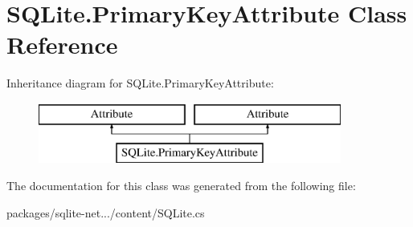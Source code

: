 \hypertarget{classSQLite_1_1PrimaryKeyAttribute}{\section{S\-Q\-Lite.\-Primary\-Key\-Attribute Class Reference}
\label{classSQLite_1_1PrimaryKeyAttribute}
}
Inheritance diagram for S\-Q\-Lite.\-Primary\-Key\-Attribute\-:\begin{figure}[H]
\begin{center}
\leavevmode
\includegraphics[height=2.000000cm]{classSQLite_1_1PrimaryKeyAttribute}
\end{center}
\end{figure}


The documentation for this class was generated from the following file\-:\begin{DoxyCompactItemize}
\item 
packages/sqlite-\/net.../content/S\-Q\-Lite.\-cs\end{DoxyCompactItemize}
